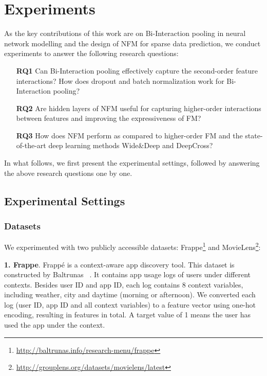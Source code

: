 \section{Experiments}
\label{sec:experiments}
As the key contributions of this work are on Bi-Interaction pooling in neural network modelling and the design of NFM for sparse data prediction, we conduct experiments to answer the following research questions:
\begin{itemize}
	\item[\textbf{RQ1}] Can Bi-Interaction pooling effectively capture the second-order feature interactions? How does dropout and batch normalization work for Bi-Interaction pooling? 
	\item[\textbf{RQ2}] Are hidden layers of NFM useful for capturing higher-order interactions between features and improving the expressiveness of FM? 
	\item[\textbf{RQ3}] How does NFM perform as compared to higher-order FM and the state-of-the-art deep learning methods Wide\&Deep and DeepCross?
\end{itemize}

In what follows, we first present the experimental settings, followed
by answering the above research questions one by one.

\subsection{Experimental Settings}
\subsubsection{\textbf{Datasets}} We experimented with two publicly accessible datasets: Frappe\footnote{\url{http://baltrunas.info/research-menu/frappe}} and MovieLens\footnote{\url{http://grouplens.org/datasets/movielens/latest}}: \\\vspace{-5pt}

\textbf{1. Frappe}.  Frapp\'e is a context-aware app discovery tool. This dataset is constructed by Baltrunas \etal~\cite{FrappeData}. It contains  app usage logs of users under different contexts. Besides user ID and app ID, each log contains 8 context variables, including weather, city and daytime (\eg morning or afternoon). We converted each log (\ie user ID, app ID and all context variables) to a feature vector using one-hot encoding, resulting in  features in total. A target value of 1 means the user has used the app under the context.  


